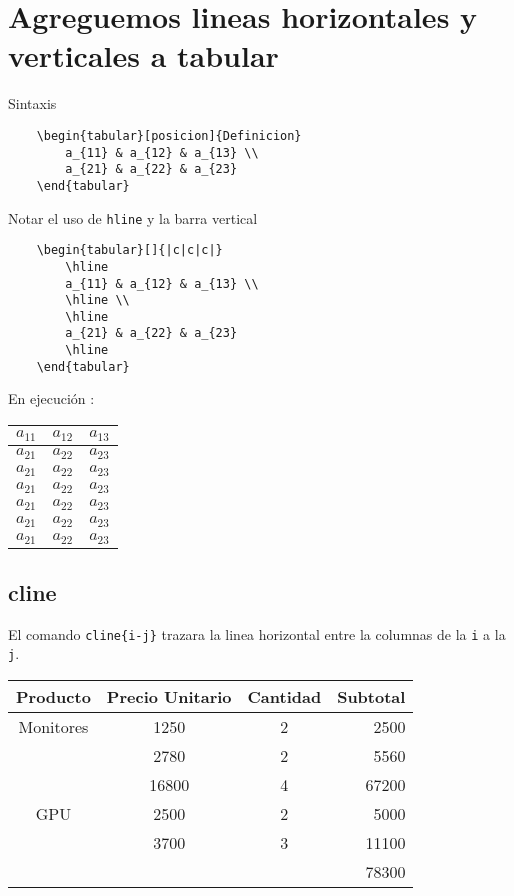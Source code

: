 \documentclass[]{article}
\begin{document}
\section{Agreguemos lineas horizontales y verticales a tabular}


\noindent Sintaxis

\begin{verbatim}
	\begin{tabular}[posicion]{Definicion}
		a_{11} & a_{12} & a_{13} \\
		a_{21} & a_{22} & a_{23}
	\end{tabular}
\end{verbatim}

Notar el uso de \verb*|hline| y la barra vertical 


\begin{verbatim}
	\begin{tabular}[]{|c|c|c|}
		\hline
		a_{11} & a_{12} & a_{13} \\
		\hline \\
		\hline
		a_{21} & a_{22} & a_{23}
		\hline
	\end{tabular}
\end{verbatim}

En ejecución :

\begin{center}
	\begin{tabular}[]{|c|c|c|}
	\hline
	$a_{11}$ & $a_{12}$ & $a_{13}$ \\
	\hline
	$a_{21}$ & $a_{22}$ & $a_{23}$\\
	\hline
	$a_{21}$ & $a_{22}$ & $a_{23}$\\
	\hline
	$a_{21}$ & $a_{22}$ & $a_{23}$\\
	\hline
	$a_{21}$ & $a_{22}$ & $a_{23}$\\
	\hline
	$a_{21}$ & $a_{22}$ & $a_{23}$\\
	\hline
	$a_{21}$ & $a_{22}$ & $a_{23}$\\
	\hline	
\end{tabular}
\end{center}



\subsection{cline}
El comando \verb*|cline{i-j}| trazara la linea 
horizontal entre la columnas de la \verb*|i|
a la \verb*|j|.
\begin{center}
\begin{tabular}{cccr}
\hline
Producto & Precio Unitario & Cantidad & Subtotal \\
\hline
Monitores & 1250 & 2 & 2500\\
		  & 2780 & 2 & 5560 \\
		  & 16800 & 4 & 67200 \\
\hline
GPU	 	  & 2500 & 2 & 5000\\
          & 3700 & 3 & 11100\\
          \cline{4-4}
          &      &   & 78300

\end{tabular}
\end{center}

 
\end{document}
